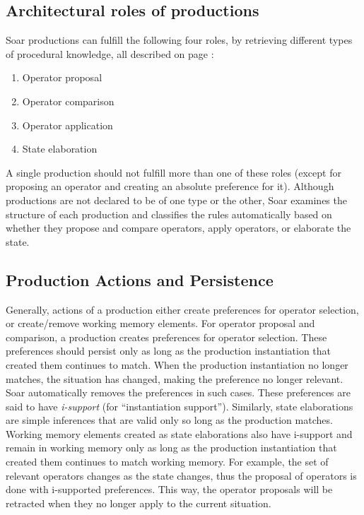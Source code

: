 \subsection{Architectural roles of productions}
\label{ARCH-pm-roles}

Soar productions can fulfill the following four roles, by retrieving different types of procedural knowledge, all described on page \pageref{LIST:4KnowledgeTypes}:

\vspace{-12pt}
\begin{enumerate}
	\item Operator proposal
	\vspace{-6pt}
	\item Operator comparison
	\vspace{-6pt}
	\item Operator application
	\vspace{-6pt}
	\item State elaboration
	\vspace{-6pt}
\end{enumerate}

A single production should not fulfill more than one of these roles (except for proposing an operator and creating an absolute preference for it). Although productions are not declared to be of one type or the other, Soar examines the structure of each production and classifies the rules automatically based on whether they propose and compare operators, apply operators, or elaborate the state. 

\subsection{Production Actions and Persistence}
\label{ARCH-prefmem-persistence}
\label{PAGE:O-support}

Generally, actions of a production either create preferences for operator selection, or create/remove working memory elements.  For operator proposal and comparison, a production creates preferences for operator selection.  These preferences should persist only as long as the production instantiation that created them continues to match.  When the production instantiation no longer matches, the situation has changed, making the preference no longer relevant.  Soar automatically removes the preferences in such cases.  These preferences are said to have \emph{i-support} (for ``instantiation support'').  Similarly, state elaborations are simple inferences that are valid only so long as the production matches.  Working memory elements created as state elaborations also have i-support and remain in working memory only as long as the production instantiation that created them continues to match working memory.  For example, the set of relevant operators changes as the state changes, thus the proposal of operators is done with i-supported preferences. This way, the operator proposals will be retracted when they no longer apply to the current situation.

